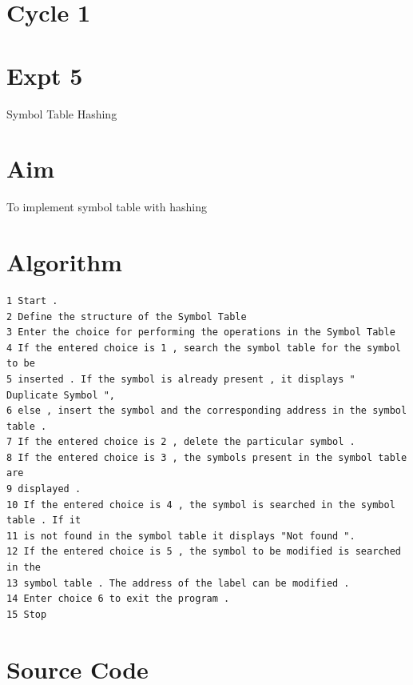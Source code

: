 \documentclass[13pt,oneside]{book}
\begin{document}
\section*{Cycle 1}
\section*{Expt 5}
\begin{center}
    \Large{Symbol Table Hashing}
\end{center}
\section*{Aim}
\large
To implement symbol table with hashing

\section*{Algorithm} 
    \begin{verbatim}
1 Start .
2 Define the structure of the Symbol Table
3 Enter the choice for performing the operations in the Symbol Table
4 If the entered choice is 1 , search the symbol table for the symbol
to be
5 inserted . If the symbol is already present , it displays "
Duplicate Symbol ",
6 else , insert the symbol and the corresponding address in the symbol
table .
7 If the entered choice is 2 , delete the particular symbol .
8 If the entered choice is 3 , the symbols present in the symbol table
are
9 displayed .
10 If the entered choice is 4 , the symbol is searched in the symbol
table . If it
11 is not found in the symbol table it displays "Not found ".
12 If the entered choice is 5 , the symbol to be modified is searched
in the
13 symbol table . The address of the label can be modified .
14 Enter choice 6 to exit the program .
15 Stop
	\end{verbatim}

\section*{Source Code}
\small
\end{document}
